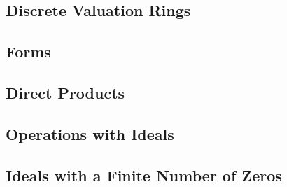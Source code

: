 \documentclass[10pt]{mypackage}
\begin{document}
\begin{exercise}[Exercise 2.18]

\end{exercise}
\subsection{Discrete Valuation Rings}%
\subsection{Forms}%
\subsection{Direct Products}%
\subsection{Operations with Ideals}%
\subsection{Ideals with a Finite Number of Zeros}%
\end{document}
